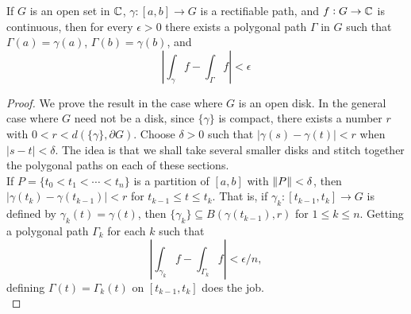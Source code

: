 	\begin{flem}
		\label{lemma: polygonal}
		If $G$ is an open set in $\mathbb{C}$, $\gamma : [a,b] \to G$ is a rectifiable path, and $f : G \to \mathbb{C}$ is continuous, then for every $\epsilon > 0$ there exists a polygonal path $\Gamma$ in $G$ such that $\Gamma(a) = \gamma(a)$, $\Gamma(b) = \gamma(b)$, and
		\[ \left| \int_\gamma f - \int_\Gamma f \right| < \epsilon \]
	\end{flem}
	\begin{proof}
		We prove the result in the case where $G$ is an open disk. In the general case where $G$ need not be a disk, since $\{\gamma\}$ is compact, there exists a number $r$ with $0 < r < d(\{\gamma\},\partial G)$. Choose $\delta > 0$ such that $|\gamma(s) - \gamma(t)| < r$ when $|s-t| < \delta$. The idea is that we shall take several smaller disks and stitch together the polygonal paths on each of these sections.\\
		If $P = \{ t_0 < t_1 < \cdots < t_n \}$ is a partition of $[a,b]$ with $\left\lVert P\right\rVert < \delta$, then $|\gamma(t_k) - \gamma(t_{k-1})| < r$ for $t_{k-1} \le t \le t_k$. That is, if $\gamma_k : [t_{k-1}, t_k] \to G$ is defined by $\gamma_k(t) = \gamma(t)$, then $\{\gamma_k\} \subseteq B(\gamma(t_{k-1}),r)$ for $1 \le k \le n$. Getting a polygonal path $\Gamma_k$ for each $k$ such that
		\[ \left| \int_{\gamma_k} f - \int_{\Gamma_k} f \right| < \epsilon/n, \]
		defining $\Gamma(t) = \Gamma_k(t)$ on $[t_{k-1},t_k]$ does the job.
		\\


\end{proof}
